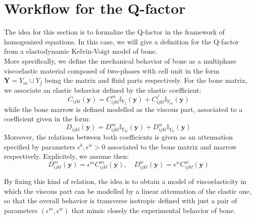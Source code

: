 \section{Workflow for the Q-factor}
The idea for this section is to formalize the Q-factor in the framework of homogenized equations.
In this case, we will give a definition for the Q-factor from a elastodynamic Kelvin-Voigt model of bone.\\
More specifically, we define the mechanical behavior of bone as a multiphase viscoelastic material composed of two-phases with cell unit in the form $\mathbf{Y} = Y_{m} \cup Y_{f}$ being the matrix and fluid parts respectively.
For the bone matrix, we associate an elastic behavior defined by the elastic coefficient:
\begin{equation*}
    C_{ijkl}(\mathbf{y}) = C_{ijkl}^m \mathbb{I}_{Y_f}(\mathbf{y}) + C_{ijkl}^f \mathbb{I}_{Y_m}(\mathbf{y})
\end{equation*}
while the bone marrow is defined modelled as the viscous part, associated to a coefficient given in the form:
\begin{equation*}
    D_{ijkl}(\mathbf{y}) =  D_{ijkl}^m \mathbb{I}_{Y_m}(\mathbf{y}) + D_{ijkl}^w \mathbb{I}_{Y_w}(\mathbf{y})
\end{equation*}
Moreover, the relations between both coefficients is given as an attenuation specified by parameters $\epsilon^b, \epsilon^w >0$ associated to the bone matrix and marrow respectively. Explicitely, we assume then:
\begin{equation*}
    D_{ijkl}^m(\mathbf{y}) = \epsilon^m C_{ijkl}^m(\mathbf{y}) , \quad D_{ijkl}^w (\mathbf{y}) = \epsilon^w C_{ijkl}^w(\mathbf{y})
\end{equation*}


\begin{rem}
By fixing this kind of relation, the idea is to obtain a model of viscoelasticity in which the viscous part can be modelled by a linear attenuation of the elastic one, so that the overall behavior is transverse isotropic defined with just a pair of parameters $(\epsilon^m, \epsilon^w)$ that mimic closely the experimental behavior of bone.
\end{rem}

